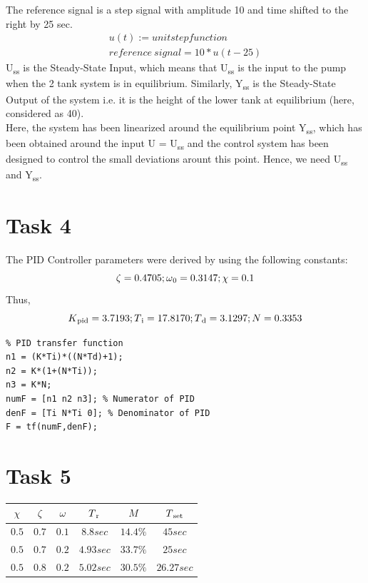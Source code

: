 \documentclass[a4paper,12pt,oneside,onecolumn]{article} %
\begin{document}
The reference signal is a step signal with amplitude 10 and time shifted to the right by 25 sec.  
 \begin{align*}
u(t) := unit step function \\
reference \ signal = 10*u(t-25)
 \end{align*}
U\textsubscript{ss} is the Steady-State Input, which means that U\textsubscript{ss} is the input to the pump when the 2 tank system is in equilibrium. Similarly, Y\textsubscript{ss} is the Steady-State Output of the system i.e. it is the height of the lower tank at equilibrium (here, considered as 40).  \\
Here, the system has been linearized around the equilibrium point Y\textsubscript{ss}, which has been obtained around the input U = U\textsubscript{ss} and the control system has been designed to control the small deviations arount this point. Hence, we need U\textsubscript{ss} and Y\textsubscript{ss}.

\section*{Task 4}

The PID Controller parameters were derived by using the following constants:
\begin{equation}
 \zeta = 0.4705; \omega \textsubscript{0} = 0.3147; \chi = 0.1
 \end{equation}
Thus,
\begin{equation}
K\textsubscript{pid} = 3.7193; T \textsubscript{i} = 17.8170; T \textsubscript{d} = 3.1297; N = 0.3353
 \end{equation}

\begin{lstlisting}
% PID transfer function
n1 = (K*Ti)*((N*Td)+1);
n2 = K*(1+(N*Ti));
n3 = K*N;
numF = [n1 n2 n3]; % Numerator of PID
denF = [Ti N*Ti 0]; % Denominator of PID
F = tf(numF,denF);
\end{lstlisting}

\section*{Task 5}
\begin{center}
 \begin{tabular}{@{\vrule height 10.5pt depth4pt  width0pt}|c|c|c|c|c|c|}
    \hline
     $\chi$ & $\zeta$ & $\omega$ & $T\textsubscript{r}$ & $M$ & $T\textsubscript{set}$ \\ \hline
     $0.5$ & $0.7$ & $0.1$ & $8.8 sec$ & $14.4\%$ & $45 sec$ \\ \hline
     $0.5$ & $0.7$ & $0.2$ & $4.93 sec$ & $33.7\%$ & $25 sec$ \\ \hline
     $0.5$ & $0.8$ & $0.2$ & $5.02 sec$ & $30.5\%$ & $26.27 sec$ \\ \hline
  \end{tabular} \\
\end{center}
\end{document}
